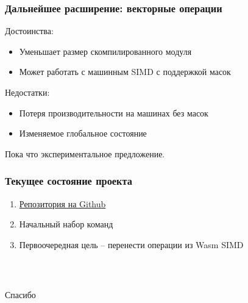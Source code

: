 \documentclass[t,aspectratio=169, xcolor={table}]{beamer}
\begin{document}
\begin{frame}
\frametitle{Дальнейшее расширение: векторные операции}
  Достоинства:
  \begin{itemize}
  \item Уменьшает размер скомпилированного модуля
  \item Может работать с машинным SIMD с поддержкой масок \pause
  \end{itemize}
  Недостатки:
  \begin{itemize}
  \item Потеря производительности на машинах без масок
  \item Изменяемое глобальное состояние
  \end{itemize}
  Пока что экспериментальное предложение.
\end{frame}
\begin{frame}
\frametitle{Текущее состояние проекта}
  \begin{enumerate}
  \item \href{https://github.com/WebAssembly/flexible-vectors}{Репозитория на Github}
  \item Начальный набор команд
  \item Первоочередная цель -- перенести операции из Wasm SIMD
  \end{enumerate}
\end{frame}
\begin{frame}
\frametitle{~}
\huge{Спасибо}
\end{frame}
\end{document}
